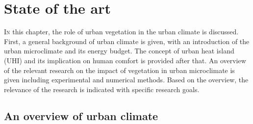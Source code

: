 \chapter{State of the art}
\label{ch:stateoftheart}
\def\figdir{chapters/ch02_stateoftheart/figures}
	
%		



\lettrine[lines=3,nindent=0em,loversize=0.1]{I}{n} this chapter, the role of urban vegetation in the urban climate is discussed. First, a general background of urban climate is given, with an introduction of the urban microclimate and its energy budget. The concept of urban heat island (UHI) and its implication on human comfort is provided after that. An overview of the relevant research on the impact of vegetation in urban microclimate is given including experimental and numerical methods. Based on the overview, the relevance of the research is indicated with specific research goals.


\section{An overview of urban climate}


